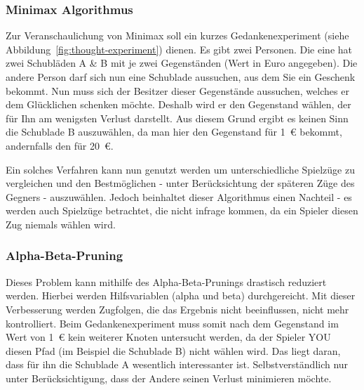 \subsubsection{Minimax Algorithmus}\label{subsubsec:minimax-algorithmus}
Zur Veranschaulichung von Minimax soll ein kurzes Gedankenexperiment (siehe Abbildung~\ref{fig:thought-experiment}) dienen.
Es gibt zwei Personen.
Die eine hat zwei Schubl\"aden A \& B mit je zwei Gegenst\"anden (Wert in Euro angegeben).
Die andere Person darf sich nun eine Schublade aussuchen, aus dem Sie ein Geschenk bekommt.
Nun muss sich der Besitzer dieser Gegenst\"ande aussuchen, welches er dem Gl\"ucklichen schenken m\"ochte.
Deshalb wird er den Gegenstand w\"ahlen, der f\"ur Ihn am wenigsten Verlust darstellt.
Aus diesem Grund ergibt es keinen Sinn die Schublade B auszuw\"ahlen, da man hier den Gegenstand f\"ur 1~\euro{} bekommt, andernfalls den f\"ur 20~\euro{}.

\vspace{1em}
\begin{center}
    \label{fig:thought-experiment}
\end{center}

Ein solches Verfahren kann nun genutzt werden um unterschiedliche Spielz\"uge zu vergleichen und den Bestm\"oglichen - unter Ber\"ucksichtung der sp\"ateren Z\"uge des Gegners - auszuw\"ahlen.
Jedoch beinhaltet dieser Algorithmus einen Nachteil - es werden auch Spielz\"uge betrachtet, die nicht infrage kommen, da ein Spieler diesen Zug niemals w\"ahlen wird.

\subsubsection{Alpha-Beta-Pruning}\label{subsubsec:alpha-beta-pruning}
Dieses Problem kann mithilfe des Alpha-Beta-Prunings drastisch reduziert werden.
Hierbei werden Hilfsvariablen (alpha und beta) durchgereicht.
Mit dieser Verbesserung werden Zugfolgen, die das Ergebnis nicht beeinflussen, nicht mehr kontrolliert.
Beim Gedankenexperiment muss somit nach dem Gegenstand im Wert von 1~\euro{} kein weiterer Knoten untersucht werden, da der Spieler YOU diesen Pfad (im Beispiel die Schublade B) nicht w\"ahlen wird.
Das liegt daran, dass f\"ur ihn die Schublade A wesentlich interessanter ist.
Selbstverst\"andlich nur unter Ber\"ucksichtigung, dass der Andere seinen Verlust minimieren m\"ochte.

